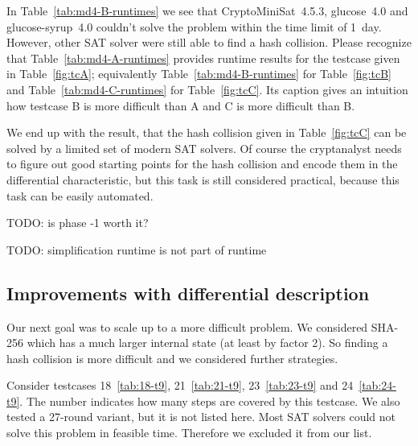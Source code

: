 In Table~\ref{tab:md4-B-runtimes} we see that CryptoMiniSat~4.5.3, glucose~4.0
and glucose-syrup~4.0 couldn't solve the problem within the time limit of 1~day.
However, other SAT solver were still able to find a hash collision. Please recognize
that Table~\ref{tab:md4-A-runtimes} provides runtime results for the testcase
given in Table~\ref{fig:tcA}; equivalently Table~\ref{tab:md4-B-runtimes} for
Table~\ref{fig:tcB} and Table~\ref{tab:md4-C-runtimes} for Table~\ref{fig:tcC}.
Its caption gives an intuition how testcase B is more difficult than A and
C is more difficult than B.

We end up with the result, that the hash collision given in Table~\ref{fig:tcC}
can be solved by a limited set of modern SAT solvers. Of course the cryptanalyst
needs to figure out good starting points for the hash collision and encode them
in the differential characteristic, but this task is still considered practical,
because this task can be easily automated.

TODO: is phase -1 worth it?

TODO: simplification runtime is not part of runtime

\subsection{Improvements with differential description}
\label{sec:result-diff-desc}
%
Our next goal was to scale up to a more difficult problem. We considered SHA-256
which has a much larger internal state (at least by factor 2). So finding a hash
collision is more difficult and we considered further strategies.

Consider testcases 18~\ref{tab:18-t9}, 21~\ref{tab:21-t9}, 23~\ref{tab:23-t9}
and 24~\ref{tab:24-t9}. The number indicates how many steps are covered by this
testcase. We also tested a 27-round variant, but it is not listed here.
Most SAT solvers could not solve this problem in feasible time. Therefore we
excluded it from our list.


